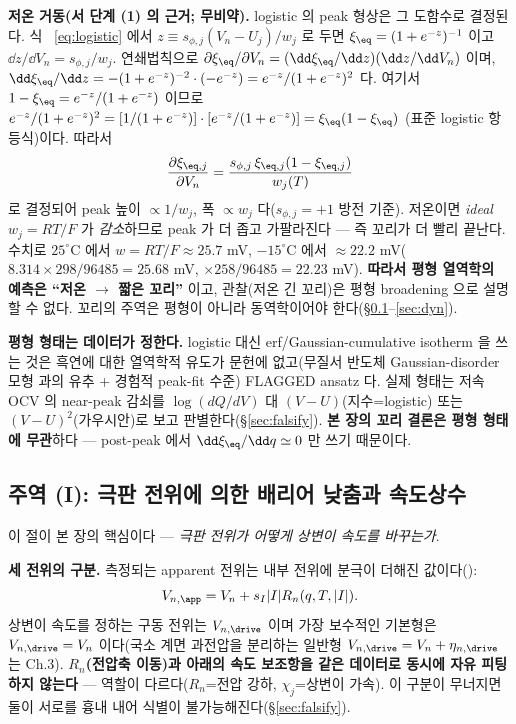 \textbf{저온 거동(서 단계 (1) 의 근거; 무비약).} logistic 의 peak 형상은 그 도함수로 결정된다. 식~
\eqref{eq:logistic} 에서 $z\equiv s_{\phi,j}(V_n-U_j)/w_j$ 로 두면 $\xi_\eq=(1+e^{-z})^{-1}$ 이고
$\dd z/\dd V_n=s_{\phi,j}/w_j$. 연쇄법칙으로 $\partial\xi_\eq/\partial V_n=(\dd\xi_\eq/\dd z)(\dd z/\dd V_n)$
이며, $\dd\xi_\eq/\dd z=-(1+e^{-z})^{-2}\cdot(-e^{-z})=e^{-z}/(1+e^{-z})^2$ 다. 여기서
$1-\xi_\eq=e^{-z}/(1+e^{-z})$ 이므로 $e^{-z}/(1+e^{-z})^2=[1/(1+e^{-z})]\cdot[e^{-z}/(1+e^{-z})]
=\xi_\eq(1-\xi_\eq)$ (표준 logistic 항등식)이다. 따라서
\begin{equation}
\frac{\partial\xi_{\eq,j}}{\partial V_n}=\frac{s_{\phi,j}\,\xi_{\eq,j}(1-\xi_{\eq,j})}{w_j(T)}
\label{eq:dxidV}
\end{equation}
로 결정되어 peak 높이 $\propto 1/w_j$, 폭 $\propto w_j$ 다($s_{\phi,j}=+1$ 방전 기준). 저온이면 \emph{ideal}
$w_j=RT/F$ 가 \emph{감소}하므로
peak 가 더 좁고 가팔라진다 — 즉 꼬리가 더 빨리 끝난다. 수치로 $25^\circ$C 에서 $w=RT/F\approx25.7$ mV,
$-15^\circ$C 에서 $\approx22.2$ mV($8.314\times298/96485=25.68$ mV, $\times258/96485=22.23$ mV).
\textbf{따라서 평형 열역학의 예측은 ``저온 $\to$ 짧은 꼬리''} 이고, 관찰(저온 긴 꼬리)은 평형 broadening 으로
설명할 수 없다. 꼬리의 주역은 평형이 아니라 동역학이어야 한다(\S\ref{sec:rate}--\ref{sec:dyn}).
\begin{flagbox}
\textbf{평형 형태는 데이터가 정한다.} logistic 대신 erf/Gaussian-cumulative isotherm 을 쓰는 것은 흑연에
대한 열역학적 유도가 문헌에 없고(무질서 반도체 Gaussian-disorder 모형 \cite{baessler1993} 과의 유추 +
경험적 peak-fit 수준) FLAGGED ansatz 다. 실제 형태는 저속 OCV 의 near-peak 감쇠를 $\log(dQ/dV)$ 대
$(V-U)$(지수=logistic) 또는 $(V-U)^2$(가우시안)로 보고 판별한다(\S\ref{sec:falsify}). \textbf{본 장의
꼬리 결론은 평형 형태에 무관}하다 — post-peak 에서 $\dd\xi_\eq/\dd q\simeq0$ 만 쓰기 때문이다.
\end{flagbox}

\subsection{주역 (I): 극판 전위에 의한 배리어 낮춤과 속도상수}\label{sec:rate}
이 절이 본 장의 핵심이다 — \emph{극판 전위가 어떻게 상변이 속도를 바꾸는가}.

\textbf{세 전위의 구분.} 측정되는 apparent 전위는 내부 전위에 분극이 더해진 값이다():
\begin{equation}
V_{n,\app}=V_n+s_I|I|R_n(q,T,|I|).
\label{eq:Vapp}
\end{equation}
상변이 속도를 정하는 구동 전위는 $V_{n,\drive}$ 이며 가장 보수적인 기본형은 $V_{n,\drive}=V_n$ 이다(국소
계면 과전압을 분리하는 일반형 $V_{n,\drive}=V_n+\eta_{n,\drive}$ 는 Ch.3). \textbf{$R_n$(전압축 이동)과
아래의 속도 보조항을 같은 데이터로 동시에 자유 피팅하지 않는다} — 역할이 다르다($R_n$=전압 강하,
$\chi_j$=상변이 가속). 이 구분이 무너지면 둘이 서로를 흉내 내어 식별이 불가능해진다(\S\ref{sec:falsify}).

